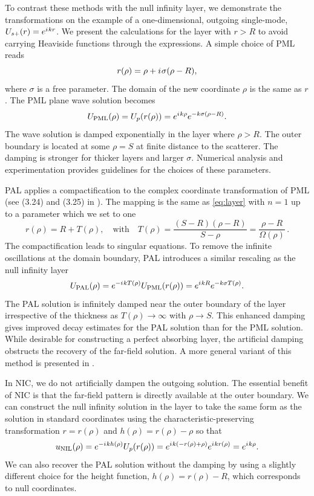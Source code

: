 \documentclass[onefignum,onetabnum]{siamart190516}
\newcommand{\be}{\begin{equation}}
\newcommand{\ee}{\end{equation}}
\newcommand{\iu}{{i\mkern1mu}}
\begin{document}
To contrast these methods with the null infinity layer, we demonstrate the transformations on the example of a one-dimensional, outgoing single-mode, $U_{s+}(r)=e^{\iu k r }$. We present the calculations for the layer with $r>R$ to avoid carrying Heaviside functions through the expressions. A simple choice of PML reads 
\be\label{eq:pml} r(\rho) = \rho + \iu \sigma (\rho-R), \ee
where $\sigma$ is a free parameter. The domain of the new coordinate $\rho$ is the same as $r$. The PML plane wave solution becomes
\[ U_{\mathrm{PML}}(\rho) = U_p(r(\rho)) = e^{\iu k \rho} e^{- k \sigma (\rho-R)}. \]
The wave solution is damped exponentially in the layer where $\rho>R$. The outer boundary is located at some $\rho=S$ at finite distance to the scatterer. The damping is stronger for thicker layers and larger $\sigma$. Numerical analysis and experimentation provides guidelines for the choices of these parameters.

PAL applies a compactification to the complex coordinate transformation of PML (see (3.24) and (3.25) in \cite{yang2021truly}). The mapping is the same as \eqref{eq:layer} with $n=1$ up to a parameter which we set to one 
\[ r(\rho) = R + T(\rho), \quad \mathrm{with} \quad T(\rho) = \frac{(S-R)(\rho-R)}{S-\rho} = \frac{\rho-R}{\Omega(\rho)}\,. \]
The compactification leads to singular equations. To remove the infinite oscillations at the domain boundary, PAL introduces a similar rescaling as the null infinity layer
\[ U_{\mathrm{PAL}}(\rho) = e^{-\iu k T(\rho)} U_{\mathrm{PML}}(r(\rho)) = e^{\iu k R} e^{-k \sigma T(\rho)}. \]
The PAL solution is infinitely damped near the outer boundary of the layer irrespective of the thickness as $T(\rho)\to\infty$ with $\rho\to S$. This enhanced damping gives improved decay estimates for the PAL solution than for the PML solution. While desirable for constructing a perfect absorbing layer, the artificial damping obstructs the recovery of the far-field solution. A more general variant of this method is presented in \cite{wang2025novel}.

In NIC, we do not artificially dampen the outgoing solution. The essential benefit of NIC is that the far-field pattern is directly available at the outer boundary. We can construct the null infinity solution in the layer to take the same form as the solution in standard coordinates using the characteristic-preserving transformation $r=r(\rho)$ and $h(\rho) = r(\rho) - \rho$ so that
\[ u_{\mathrm{NIL}}(\rho) = e^{-\iu k h(\rho)} U_p(r(\rho)) = e^{\iu k (-r(\rho)+\rho)} e^{\iu k r(\rho)} = e^{\iu k \rho}. \]
We can also recover the PAL solution without the damping by using a slightly different choice for the height function,  $h(\rho) = r(\rho) - R$, which corresponds to null coordinates.  
\end{document}
